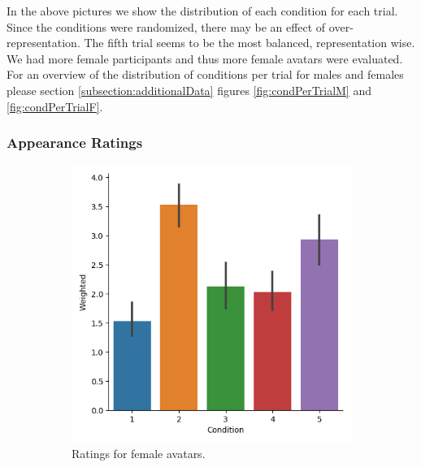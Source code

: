 In the above pictures we show the distribution of each condition for each trial. Since the conditions were randomized, there may be an effect of over-representation. The fifth trial seems to be the most balanced, representation wise.
We had more female participants and thus more female avatars were evaluated. For an overview of the distribution of conditions per trial for males and females please section \ref{subsection:additionalData} figures \ref{fig:condPerTrialM} and \ref{fig:condPerTrialF}.

\subsubsection{Appearance Ratings}
\begin{figure}[H]
 \hspace*{\fill}
     \begin{subfigure}[b]{0.4\textwidth}
         \centering
         \includegraphics[width=\textwidth]{Files/Plots/weighted_ratings_female_experiment.png}
         \caption{Ratings for female avatars.}
         \label{fig:weightedFEx}
     \end{subfigure}
      \hspace*{\fill}
     \begin{subfigure}[b]{0.4\textwidth}
         \centering

\end{subfigure}
\end{figure}
